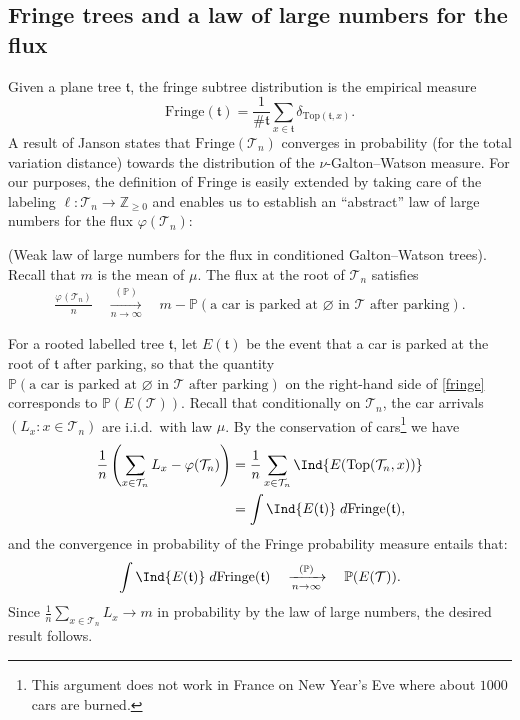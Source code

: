  
 \subsection{Fringe trees and a law of large numbers for the flux}
Given a plane tree $ \mathfrak{t}$, the fringe subtree distribution is the empirical measure 
$$ \mathrm{Fringe}(  \mathfrak{t}) =  \frac{1}{\# \mathfrak{t}} \sum_{x \in \mathfrak{t}} \delta_{ \mathrm{Top}(  \mathfrak{t},x)}.$$
A result of Janson  \cite[Theorem 1.3, Quenched version, Formula (1.11)]{JA16} states that $\mathrm{Fringe}( \mathcal{T}_{n})$ converges in probability (for the total variation distance) towards the distribution of the $\nu$-Galton--Watson measure. For our purposes, the definition of $ \mathrm{Fringe}$ is easily extended by taking care of the labeling $\ell : \mathcal{T}_{n} \to \mathbb{Z}_{\geq 0}$ and enables us to establish an ``abstract'' law of large numbers for the flux $\varphi( \mathcal{T}_{n})$:

\begin{lemma}(Weak law of large numbers for the flux in conditioned Galton--Watson trees)\label{prop:janson-fringe}. Recall that $m$ is the mean of $\mu$. 
The flux at the root of $ \mathcal{T}_{n}$ satisfies
\begin{eqnarray} \frac{\varphi_{}( \mathcal{T}_n)}{n} \quad \xrightarrow[n\to\infty]{( \mathbb{P})}  \quad m- \mathbb{P}(\mbox{a car is parked at } \varnothing \mbox{ in }  \mathcal{T} \mbox{ after parking}).  
\label{fringe}
\end{eqnarray}
\end{lemma}

\proof 

For a rooted labelled tree $\mathfrak t$, let $E(\mathfrak{t})$ be the event that a car is parked at the root of $\mathfrak{t}$ after parking, so that the quantity $\mathbb{P}(\mbox{a car is parked at } \varnothing \mbox{ in }  \mathcal{T} \mbox{ after parking})$ on the right-hand side of \eqref{fringe} corresponds to $\mathbb{P}( E(\mathcal T))$. Recall that  conditionally on $ \mathcal{T}_{n}$, the car arrivals $(L_x: x \in \mathcal{T}_{n})$ are i.i.d.~with law $\mu$. By the conservation of cars\footnote{This argument does not work in France on New Year's Eve where about $1000$ cars are burned.} we have  
\begin{align*} 
\frac{1}{n}
\left(\sum_{x \in \mathcal{T}_n} L_x  - \varphi( \mathcal{T}_{n})  \right)
 & = \frac{1}{n}  \sum_{x \in \mathcal{T}_n} \Ind{ E(\mathrm{Top}( \mathcal{T}_{n},x))} \\
&  = \int \Ind{E(\mathfrak{t})} \;  d \mathrm{Fringe} (\mathfrak{t}), \end{align*} 
and the convergence in probability of the Fringe probability measure entails that:
$$\int \Ind{E(\mathfrak{t})} \;  d \mathrm{Fringe} (\mathfrak{t}) \quad \xrightarrow[n\to\infty]{( \mathbb{P})}\quad  \mathbb{P}( E(\mathcal T)).$$
Since $\frac{1}{n}\sum_{x \in \mathcal{T}_n} L_x \to m$ in probability by the  law of large numbers, the desired result follows. \endproof



